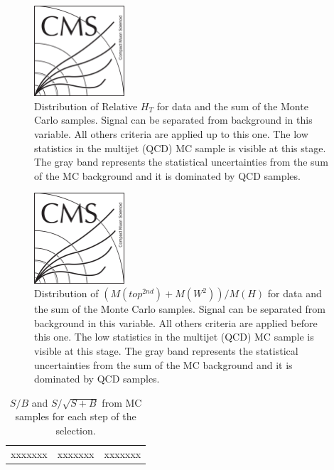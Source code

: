 \begin{figure}[!Hhtbp]
  \begin{center}
    \includegraphics[width=0.3\textwidth]{figs/CMSlogo.png}
    \caption{Distribution of Relative $H_{T}$ for data and the sum of the Monte Carlo samples. Signal can be separated from background in this variable. All others criteria are applied up to this one. The low statistics in the multijet (QCD) MC sample is visible at this stage. The gray band represents the statistical uncertainties from the sum of the MC background and it is dominated by QCD samples.}
    \label{fig:RelHtMass}
  \end{center}
\end{figure}\clearpage

\begin{figure}[!Hhtbp]
  \begin{center}
    \includegraphics[width=0.3\textwidth]{figs/CMSlogo.png}
    \caption{Distribution of $(M(top^{2nd})+M(W^{2}))/M(H)$ 
      for data and the sum of the Monte Carlo samples. Signal
      can be separated from background in this variable. All
      others criteria are applied before this one. The low statistics
      in the multijet (QCD) MC sample is visible at this
      stage. The gray band represents the statistical uncertainties
      from the sum of the MC background and it is dominated by QCD
      samples.}
    \label{fig:m2thp}
  \end{center}
\end{figure}\clearpage

\begin{table}[htbH]
\label{tab:Estimators}
\begin{center}
\begin{tabular}{|c|c|c|}
xxxxxxx & xxxxxxx & xxxxxxx
\end{tabular}
\caption{$S/B$ and $S/\sqrt{S+B}$ from MC samples for each step of the selection.}
\end{center}
\end{table}\clearpage

